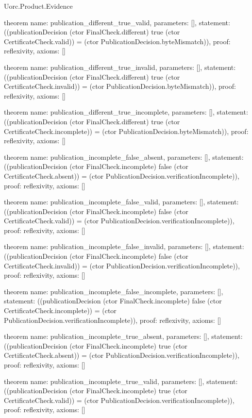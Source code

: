 \begin{lexlean}{Uorc.Product.Evidence}
\begin{semanticmodule}
theorem{
  name: publication_different_true_valid,
  parameters: [],
  statement: ((publicationDecision (ctor FinalCheck.different) true (ctor CertificateCheck.valid)) = (ctor PublicationDecision.byteMismatch)),
  proof: reflexivity{},
  axioms: []
}

theorem{
  name: publication_different_true_invalid,
  parameters: [],
  statement: ((publicationDecision (ctor FinalCheck.different) true (ctor CertificateCheck.invalid)) = (ctor PublicationDecision.byteMismatch)),
  proof: reflexivity{},
  axioms: []
}

theorem{
  name: publication_different_true_incomplete,
  parameters: [],
  statement: ((publicationDecision (ctor FinalCheck.different) true (ctor CertificateCheck.incomplete)) = (ctor PublicationDecision.byteMismatch)),
  proof: reflexivity{},
  axioms: []
}

theorem{
  name: publication_incomplete_false_absent,
  parameters: [],
  statement: ((publicationDecision (ctor FinalCheck.incomplete) false (ctor CertificateCheck.absent)) = (ctor PublicationDecision.verificationIncomplete)),
  proof: reflexivity{},
  axioms: []
}

theorem{
  name: publication_incomplete_false_valid,
  parameters: [],
  statement: ((publicationDecision (ctor FinalCheck.incomplete) false (ctor CertificateCheck.valid)) = (ctor PublicationDecision.verificationIncomplete)),
  proof: reflexivity{},
  axioms: []
}

theorem{
  name: publication_incomplete_false_invalid,
  parameters: [],
  statement: ((publicationDecision (ctor FinalCheck.incomplete) false (ctor CertificateCheck.invalid)) = (ctor PublicationDecision.verificationIncomplete)),
  proof: reflexivity{},
  axioms: []
}

theorem{
  name: publication_incomplete_false_incomplete,
  parameters: [],
  statement: ((publicationDecision (ctor FinalCheck.incomplete) false (ctor CertificateCheck.incomplete)) = (ctor PublicationDecision.verificationIncomplete)),
  proof: reflexivity{},
  axioms: []
}

theorem{
  name: publication_incomplete_true_absent,
  parameters: [],
  statement: ((publicationDecision (ctor FinalCheck.incomplete) true (ctor CertificateCheck.absent)) = (ctor PublicationDecision.verificationIncomplete)),
  proof: reflexivity{},
  axioms: []
}

theorem{
  name: publication_incomplete_true_valid,
  parameters: [],
  statement: ((publicationDecision (ctor FinalCheck.incomplete) true (ctor CertificateCheck.valid)) = (ctor PublicationDecision.verificationIncomplete)),
  proof: reflexivity{},
  axioms: []
}


\end{semanticmodule}
\end{lexlean}
